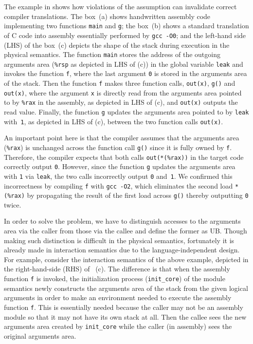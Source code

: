%
The example in  shows how violations of the assumption
can invalidate correct compiler translations.
%
The box~(a) shows handwritten assembly code implementing two functions
\texttt{main} and \texttt{g}; the box~(b) shows a standard translation
of C code into assembly essentially performed by \texttt{gcc -O0}; and
the left-hand side (LHS) of the box~(c) depicts the shape of the stack
during execution in the physical semantics.
The function \texttt{main} stores the address of the
outgoing arguments area (\ie \texttt{\%rsp} as depicted in LHS of (c))
in the global variable \texttt{leak} and invokes the function
\texttt{f}, where the last argument \texttt{0} is stored in the
arguments area of the stack. Then the function \texttt{f} makes three
function calls, \texttt{out(x)}, \texttt{g()} and \texttt{out(x)},
where the argument \texttt{x} is directly read from the arguments area
pointed to by \texttt{\%rax} in the assembly, as depicted in LHS of
(c), and \texttt{out(x)} outputs the read value.  Finally, the
function \texttt{g} updates the arguments area pointed to by
\texttt{leak} with~\texttt{1}, as depicted in LHS of (c), between the
two function calls \texttt{out(x)}.

An important point here is that the compiler assumes that the
arguments area (\ie \texttt{\%rax}) is unchanged across the
function call \texttt{g()} since it is fully owned by \texttt{f}.
Therefore, the compiler expects that both calls
\texttt{out(*(\%rax))} in the target code correctly output
\texttt{0}. However, since the function \texttt{g} updates the
arguments area with \texttt{1} via \texttt{leak}, the two calls
incorrectly output \texttt{0} and~\texttt{1}.
We confirmed this incorrectness by
compiling \texttt{f} with \texttt{gcc -O2}, which
eliminates the second load \texttt{*(\%rax)} by propagating
the result of the first load across \texttt{g()}
thereby outputting \texttt{0} twice.

%
In order to solve the problem, we have to distinguish accesses to the
arguments area via the caller from those via the callee and define the
former as UB. Though making such distinction is difficult in the
physical semantics, fortunately it is already made in interaction
semantics due to the language-independent design. For example, consider
the interaction semantics of the above example, depicted in the
right-hand-side (RHS) of ~(c).  The
difference is that when the assembly function \texttt{f} is invoked,
the initialization process (\ie \texttt{init\_core}) of the module
semantics newly constructs the arguments area of the stack from the
given logical arguments in order to make an environment needed to
execute the assembly function \texttt{f}. This is essentially needed
because the caller may not be an assembly module so that it may not
have its own stack at all.  Then the callee sees the new arguments
area created by \texttt{init\_core} while the caller (in assembly)
sees the original arguments area.

